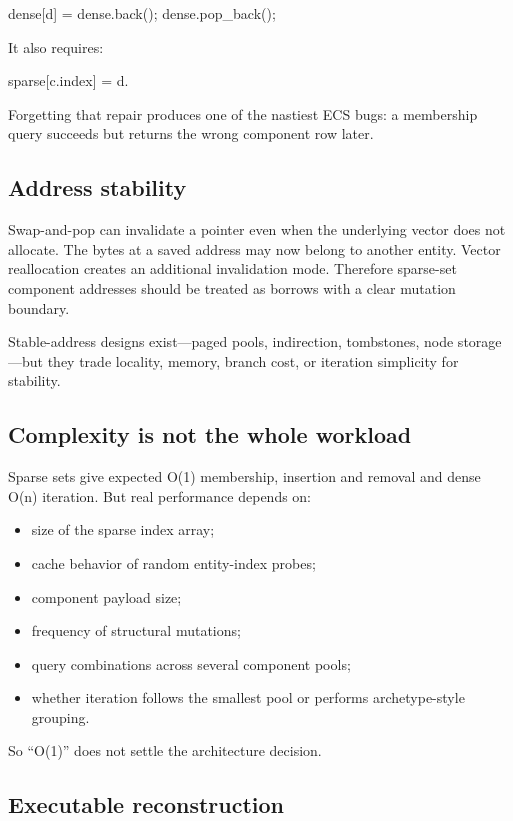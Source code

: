 dense{[}d{]} = dense.back(); dense.pop\_back();

It also requires:

sparse{[}c.index{]} = d.

Forgetting that repair produces one of the nastiest ECS bugs: a membership query succeeds but returns the wrong component row later.

\subsection{Address stability}\label{address-stability}

Swap-and-pop can invalidate a pointer even when the underlying vector does not allocate. The bytes at a saved address may now belong to another entity. Vector reallocation creates an additional invalidation mode. Therefore sparse-set component addresses should be treated as borrows with a clear mutation boundary.

Stable-address designs exist---paged pools, indirection, tombstones, node storage---but they trade locality, memory, branch cost, or iteration simplicity for stability.

\subsection{Complexity is not the whole workload}\label{complexity-is-not-the-whole-workload}

Sparse sets give expected O(1) membership, insertion and removal and dense O(n) iteration. But real performance depends on:

\begin{itemize}
\tightlist
\item
  size of the sparse index array;
\item
  cache behavior of random entity-index probes;
\item
  component payload size;
\item
  frequency of structural mutations;
\item
  query combinations across several component pools;
\item
  whether iteration follows the smallest pool or performs archetype-style grouping.
\end{itemize}

So ``O(1)'' does not settle the architecture decision.

\subsection{Executable reconstruction}\label{executable-reconstruction}


